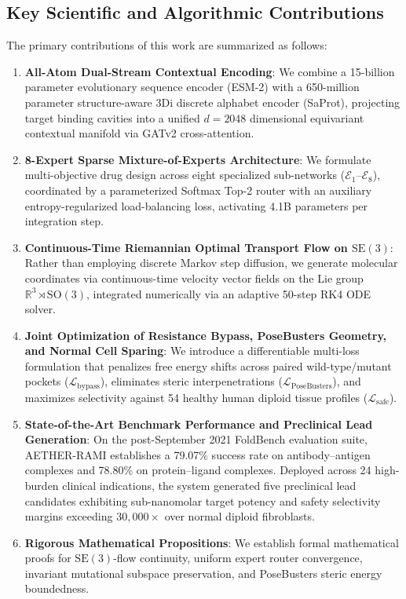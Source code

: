 \documentclass[10pt,journal,compsoc]{IEEEtran}
\begin{document}
\subsection{Key Scientific and Algorithmic Contributions}
The primary contributions of this work are summarized as follows:
\begin{enumerate}
    \item \textbf{All-Atom Dual-Stream Contextual Encoding}: We combine a 15-billion parameter evolutionary sequence encoder (ESM-2) with a 650-million parameter structure-aware 3Di discrete alphabet encoder (SaProt), projecting target binding cavities into a unified $d=2048$ dimensional equivariant contextual manifold via GATv2 cross-attention.
    \item \textbf{8-Expert Sparse Mixture-of-Experts Architecture}: We formulate multi-objective drug design across eight specialized sub-networks ($\mathcal{E}_1$--$\mathcal{E}_8$), coordinated by a parameterized Softmax Top-2 router with an auxiliary entropy-regularized load-balancing loss, activating 4.1B parameters per integration step.
    \item \textbf{Continuous-Time Riemannian Optimal Transport Flow on $\mathrm{SE}(3)$}: Rather than employing discrete Markov step diffusion, we generate molecular coordinates via continuous-time velocity vector fields on the Lie group $\mathbb{R}^3 \rtimes \mathrm{SO}(3)$, integrated numerically via an adaptive 50-step RK4 ODE solver.
    \item \textbf{Joint Optimization of Resistance Bypass, PoseBusters Geometry, and Normal Cell Sparing}: We introduce a differentiable multi-loss formulation that penalizes free energy shifts across paired wild-type/mutant pockets ($\mathcal{L}_{\text{bypass}}$), eliminates steric interpenetrations ($\mathcal{L}_{\text{PoseBusters}}$), and maximizes selectivity against 54 healthy human diploid tissue profiles ($\mathcal{L}_{\text{safe}}$).
    \item \textbf{State-of-the-Art Benchmark Performance and Preclinical Lead Generation}: On the post-September 2021 FoldBench evaluation suite, AETHER-RAMI establishes a 79.07\% success rate on antibody--antigen complexes and 78.80\% on protein--ligand complexes. Deployed across 24 high-burden clinical indications, the system generated five preclinical lead candidates exhibiting sub-nanomolar target potency and safety selectivity margins exceeding $30,000\times$ over normal diploid fibroblasts.
    \item \textbf{Rigorous Mathematical Propositions}: We establish formal mathematical proofs for $\mathrm{SE}(3)$-flow continuity, uniform expert router convergence, invariant mutational subspace preservation, and PoseBusters steric energy boundedness.
\end{enumerate}
\end{document}
